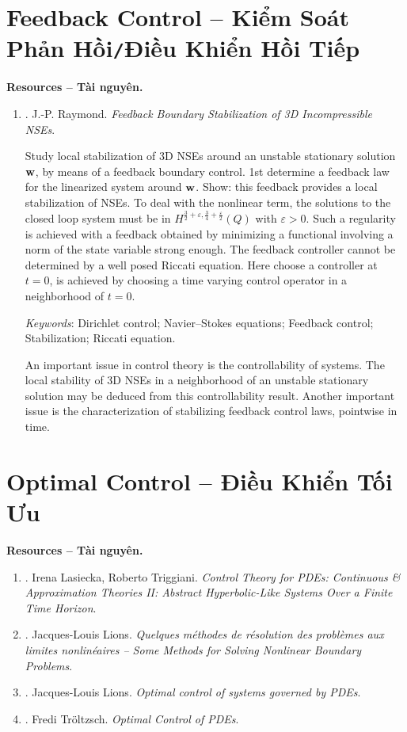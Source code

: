 \documentclass{article}
\begin{document}
\section{Feedback Control -- Kiểm Soát Phản Hồi{\tt/}Điều Khiển Hồi Tiếp}
\textbf{\textsf{Resources -- Tài nguyên.}}
\begin{enumerate}
	\item \cite{Raymond2007}. {\sc J.-P. Raymond}. {\it Feedback Boundary Stabilization of 3D Incompressible NSEs}.
	
	Study local stabilization of 3D NSEs around an unstable stationary solution ${\bf w}$, by means of a feedback boundary control. 1st determine a feedback law for the linearized system around ${\bf w}$. Show: this feedback provides a local stabilization of NSEs. To deal with the nonlinear term, the solutions to the closed loop system must be in $H^{\frac{3}{2} + \varepsilon,\frac{3}{4} + \frac{\varepsilon}{2}}(Q)$ with $\varepsilon > 0$. Such a regularity is achieved with a feedback obtained by minimizing a functional involving a norm of the state variable strong enough. The feedback controller cannot be determined by a well posed Riccati equation. Here choose a controller at $t = 0$, is achieved by choosing a time varying control operator in a neighborhood of $t = 0$.
	
	{\it Keywords}: Dirichlet control; Navier–Stokes equations; Feedback control; Stabilization; Riccati equation.
	
	An important issue in control theory is the controllability of systems. The local stability of 3D NSEs in a neighborhood of an unstable stationary solution may be deduced from this controllability result. Another important issue is the characterization of stabilizing feedback control laws, pointwise in time.
\end{enumerate}


\section{Optimal Control -- Điều Khiển Tối Ưu}
\textbf{\textsf{Resources -- Tài nguyên.}}
\begin{enumerate}
	\item \cite{Lasiecka_Triggiani2000}. {\sc Irena Lasiecka, Roberto Triggiani}. {\it Control Theory for PDEs: Continuous \& Approximation Theories II: Abstract Hyperbolic-Like Systems Over a Finite Time Horizon}.
	\item \cite{Lions1969}. {\sc Jacques-Louis Lions}. {\it Quelques m\'{e}thodes de r\'{e}solution des probl\`emes aux limites nonlin\'{e}aires -- Some Methods for Solving Nonlinear Boundary Problems}.
	\item \cite{Lions1971}. {\sc Jacques-Louis Lions}. {\it Optimal control of systems governed by PDEs}.
	\item \cite{Troltzsch2010}. {\sc Fredi Tr\"{o}ltzsch}. {\it Optimal Control of PDEs}.
\end{enumerate}
\end{document}
